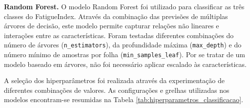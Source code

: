 \textbf{Random Forest.}  
O modelo Random Forest foi utilizado para classificar as três classes do FatigueIndex. Através da combinação das previsões de múltiplas árvores de decisão, este modelo permite capturar relações não lineares e interações entre as características. Foram testadas diferentes combinações do número de árvores (\texttt{n\_estimators}), da profundidade máxima (\texttt{max\_depth}) e do número mínimo de amostras por folha (\texttt{min\_samples\_leaf}). Por se tratar de um modelo baseado em árvores, não foi necessário aplicar escalado às características.

A seleção dos hiperparâmetros foi realizada através da experimentação de diferentes combinações de valores. As configurações e grelhas utilizadas nos modelos encontram-se resumidas na Tabela \ref{tab:hiperparametros_classificacao}.

